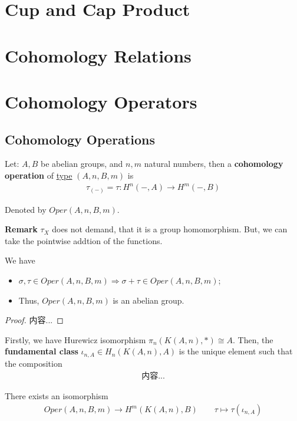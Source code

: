 \documentclass[Total.tex]{subfiles}
\begin{document}
		\section{Cup and Cap Product}
		\section{Cohomology Relations}
		\section{Cohomology Operators}
			\subsection{Cohomology Operations}
			\begin{Def}
				Let: $A,B$ be abelian groups, and $n,m$ natural numbers, then a \textbf{cohomology operation} of \underline{type} $(A,n,B,m)$ is 
				\begin{gather*}
					\tau_{(-)}=\tau:H^n(-,A)\rightarrow H^m(-,B)
				\end{gather*}
				
				Denoted by $Oper(A,n,B,m)$.
				
				\textbf{Remark} $\tau_X$ does not demand, that it is a group homomorphism. But, we can take the pointwise addtion of the functions.
			\end{Def}
			
			\begin{lemma}
				We have
				\begin{itemize}
					\item $\sigma,\tau\in Oper(A,n,B,m)\Rightarrow \sigma+\tau\in Oper(A,n,B,m)$;
					\item Thus, $Oper(A,n,B,m)$ is an abelian group.
				\end{itemize}
			\end{lemma}
			\begin{proof}
				内容...
			\end{proof}
			
			\begin{Def}
				Firstly, we have Hurewicz isomorphism $\pi_n(K(A,n),*)\cong A$. Then, the \textbf{fundamental class} $\iota_{n,A}\in H_n(K(A,n),A)$ is the unique element such that the composition
				\begin{gather*}
					内容...
				\end{gather*}
			\end{Def}
			
			\begin{theorem}
				There exists an isomorphism
				\begin{gather*}
					Oper(A,n,B,m)\rightarrow H^m(K(A,n),B)\qquad \tau\mapsto \tau(\iota_{n,A})
				\end{gather*}
			\end{theorem}
			
\end{document}
